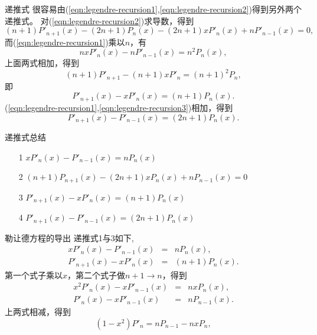 \documentclass[11pt]{beamer}
\begin{document}
\begin{frame}{递推式}
很容易由(\ref{eqn:legendre-recursion1},\ref{eqn:legendre-recursion2})得到另外两个递推式。
对(\ref{eqn:legendre-recursion2})求导数，得到
\begin{equation}
(n+1)P'_{n+1}(x) - (2n+1)P_n(x) - (2n+1)xP'_n(x) + nP'_{n-1}(x) = 0,
\end{equation}
而(\ref{eqn:legendre-recursion1})乘以$n$，有
\begin{equation}
n x P'_n(x) - nP'_{n-1}(x) = n^2 P_n(x),
\end{equation}
上面两式相加，得到
\begin{equation}
(n+1)P'_{n+1} - (n+1) xP'_n = (n+1)^2 P_n,
\end{equation}
即
\begin{equation}
P'_{n+1}(x) - xP'_{n}(x) = (n+1)P_n(x).
\label{eqn:legendre-recursion3}
\end{equation}
(\ref{eqn:legendre-recursion1},\ref{eqn:legendre-recursion3})相加，得到
\begin{equation}
P'_{n+1}(x) - P'_{n-1}(x) = (2n+1)P_n(x).
\label{eqn:legendre-recursion4}
\end{equation}

\end{frame}

\begin{frame}{递推式总结}

\begin{itemize}
\item [1] $xP'_n(x) - P'_{n-1}(x) = nP_n(x)$
\item [2] $(n+1) P_{n+1}(x) - (2n+1)xP_n(x) + nP_{n-1}(x) = 0$
\item [3] $P'_{n+1}(x) - xP'_{n}(x) = (n+1)P_n(x)$
\item [4] $P'_{n+1}(x) - P'_{n-1}(x) = (2n+1)P_n(x)$
\end{itemize}


\end{frame}

\begin{frame}{勒让德方程的导出}
递推式1与3如下, 
\begin{eqnarray}
xP'_n(x) - P'_{n-1}(x) &=& nP_n(x), \nonumber\\
P'_{n+1}(x) - xP'_{n}(x) &=& (n+1)P_n(x). \nonumber
\end{eqnarray}
第一个式子乘以$x$，第二个式子做$n+1 \rightarrow n$，得到
\begin{eqnarray}
x^2 P'_n(x) - x P'_{n-1}(x) &=& n x P_n(x), \nonumber\\
P'_{n}(x) - xP'_{n-1}(x) &=& n P_{n-1} (x). \nonumber
\end{eqnarray}
上两式相减，得到
\begin{equation}
(1-x^2)P'_n = nP_{n-1} - nxP_n,
\end{equation}
\end{frame}
\end{document}
